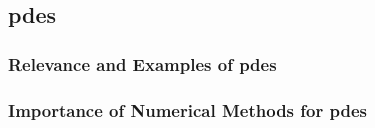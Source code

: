 \subsection{\texorpdfstring{\acrlong{pdes}}{}}

\begin{frame}
    \frametitle{Relevance and Examples of \acrfull{pdes}}

    
\end{frame}

\begin{frame}
    \frametitle{Importance of Numerical Methods for \acrshort{pdes}}

    
\end{frame}